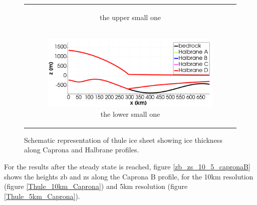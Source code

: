 \documentclass{article}
\begin{document}
\begin{figure}[!h]
\begin{tabular}[c]{@{}c@{}}
\begin{subfigure}[c]{.48\linewidth}
      \caption
        {%
          the upper small one%
          \label{fig:upper}%
        }%
    \end{subfigure}\\
    \noalign{\bigskip}%
    \begin{subfigure}[c]{.48\linewidth}
      \centering
      \includegraphics[width=\linewidth,page=2]{../fig/Halbranes_thule_domain_con_fondo.png}%
      \caption
        {%
          the lower small one%
          \label{fig:lower}%
        }%
    \end{subfigure}
  \end{tabular}
  \caption
    {%
      Schematic representation of thule ice sheet showing ice thickness along Caprona and Halbrane profiles.%
      \label{fig:every}%
    }
\end{figure}

For the results after the steady state is reached, figure \ref{zb_zs_10_5_capronaB} shows the heights zb and zs along the Caprona B profile, for the 10km resolution (figure \ref{Thule_10km_Caprona}) and 5km resolution (figure \ref{Thule_5km_Caprona}).
\end{document}
